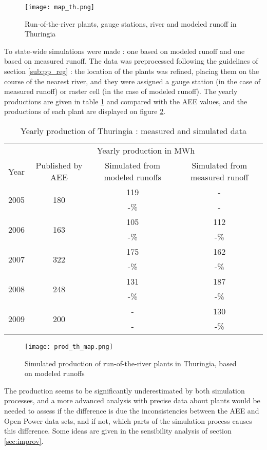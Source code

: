\begin{figure}[H]
\centering
\texttt{[image: map\_th.png]}
\caption{Run-of-the-river plants, gauge stations, river and modeled runoff in Thuringia}
\label{map_th}
\end{figure}

To state-wide simulations were made : one based on modeled runoff and one based on measured runoff. The data was preprocessed following the guidelines of section \ref{sub:pp_reg} : the location of the plants was refined, placing them on the course of the nearest river, and they were assigned a gauge station (in the case of measured runoff) or raster cell (in the case of modeled runoff). The yearly productions are given in table \ref{res_th} and compared with the AEE values, and the productions of each plant are displayed on figure \ref{prod_th_map}.

\begin{table}[H]
\footnotesize
 \centering
 \caption{Yearly production of Thuringia : measured and simulated data}
 \label{res_th}
 \begin{tabular}{|l|ccc|}
 \hline
  &\multicolumn{3}{c|}{Yearly production in MWh}\\
  Year&Published by AEE&Simulated from modeled runoffs&Simulated from measured runoff\\
  \hline \hline
  \multirow{2}{*}{2005}&\multirow{2}{*}{180}&119&-\\
  &&-\unit[34]{\%}&-\\
  \hline
  \multirow{2}{*}{2006}&\multirow{2}{*}{163}&105&112\\
  &&-\unit[36]{\%}&-\unit[31]{\%}\\
  \hline
  \multirow{2}{*}{2007}&\multirow{2}{*}{322}&175&162\\
  &&-\unit[46]{\%}&-\unit[50]{\%}\\
  \hline
  \multirow{2}{*}{2008}&\multirow{2}{*}{248}&131&187\\
  &&-\unit[47]{\%}&-\unit[25]{\%}\\
  \hline
  \multirow{2}{*}{2009}&\multirow{2}{*}{200}&-&130\\
  &&-&-\unit[35]{\%}\\
  \hline
 \end{tabular}
\end{table}

\begin{figure}[H]
\centering
\texttt{[image: prod\_th\_map.png]}
\caption{Simulated production of run-of-the-river plants in Thuringia, based on modeled runoffs}
\label{prod_th_map}
\end{figure}
 
The production seems to be significantly underestimated by both simulation processes, and a more advanced analysis with precise data about plants would be needed to assess if the difference is due the inconsistencies between the AEE and Open Power data sets, and if not, which parts of the simulation process causes this difference. Some ideas are given in the sensibility analysis of section \ref{sec:improv}.